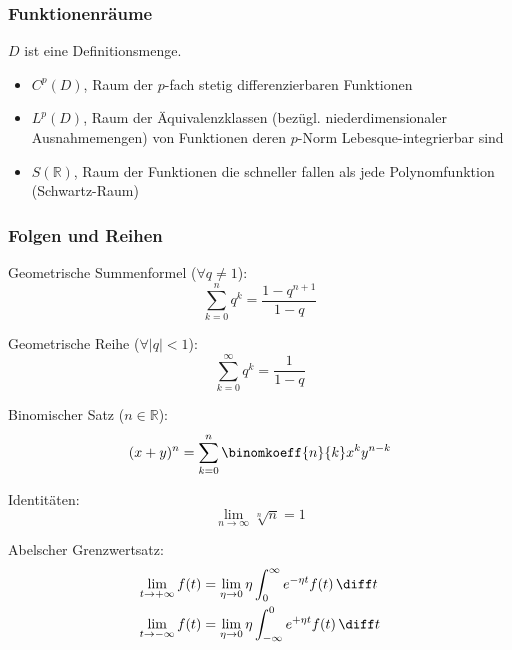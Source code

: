 \documentclass[11pt]{article}
\numberwithin{equation}{section}
\begin{document}
      \subsubsection{Funktionenräume}
        $D$ ist eine Definitionsmenge.
        \begin{itemize}
          \item $C^p(D)$, Raum der $p$-fach stetig differenzierbaren Funktionen
          \item $L^p(D)$, Raum der Äquivalenzklassen (bezügl. niederdimensionaler Ausnahmemengen) von Funktionen deren $p$-Norm Lebesque-integrierbar sind
          \item $S(\mathbb{R})$, Raum der Funktionen die schneller fallen als jede Polynomfunktion (Schwartz-Raum)
        \end{itemize}

      \subsubsection{Folgen und Reihen}
          Geometrische Summenformel ($\forall q \ne 1$):
          \begin{equation}
            \sum_{k=0}^n q^k=\frac{1-q^{n+1}}{1-q}
          \end{equation}

          Geometrische Reihe ($\forall \left|q\right| < 1$):
          \begin{equation}
            \sum_{k=0}^\infty q^k= \frac{1}{1-q}
          \end{equation}

          Binomischer Satz ($n\in\mathbb{R}$):
          \begin{equation}
            (x+y)^n=\sum_{k=0}^{n}\binomkoeff{n}{k}x^k y^{n-k}
          \end{equation}

          Identitäten:
          \begin{equation}
            \lim_{n\rightarrow\infty} \sqrt[n]{n} = 1
          \end{equation}

          Abelscher Grenzwertsatz:
          \begin{equation}
            \begin{aligned}
              \lim_{t\rightarrow+\infty} f(t) &= \lim_{\eta\rightarrow 0} \eta \int_0^\infty e^{-\eta t} f(t) \,\diff t \\
              \lim_{t\rightarrow-\infty} f(t) &= \lim_{\eta\rightarrow 0} \eta \int_{-\infty}^{0} e^{+\eta t} f(t) \,\diff t \\
            \end{aligned}
          \end{equation}
\end{document}
